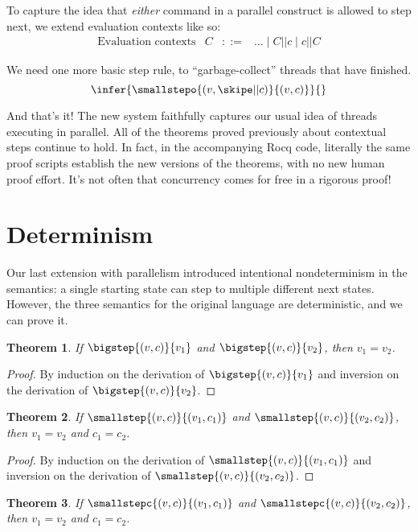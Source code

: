 \documentclass{amsbook}
\newtheorem{theorem}{Theorem}[chapter]
\theoremstyle{definition}
\theoremstyle{remark}
\numberwithin{section}{chapter}
\numberwithin{equation}{chapter}
\begin{document}
To capture the idea that \emph{either} command in a parallel construct is allowed to step next, we extend evaluation contexts like so:
\encoding
$$\begin{array}{rrcl}
  \textrm{Evaluation contexts} & C &::=& \ldots \mid C || c \mid c || C
\end{array}$$

We need one more basic step rule, to ``garbage-collect'' threads that have finished.
$$\infer{\smallstepo{(v, \skipe || c)}{(v, c)}}{}$$

And that's it!
The new system faithfully captures our usual idea of threads executing in parallel.
All of the theorems proved previously about contextual steps continue to hold.
In fact, in the accompanying Rocq code, literally the same proof scripts establish the new versions of the theorems, with no new human proof effort.
It's not often that concurrency comes for free in a rigorous proof!


\section{Determinism}

Our last extension with parallelism introduced intentional nondeterminism in the semantics: a single starting state can step to multiple different next states.
However, the three semantics for the original language are deterministic, and we can prove it.

\begin{theorem}
  If $\bigstep{(v, c)}{v_1}$ and $\bigstep{(v, c)}{v_2}$, then $v_1 = v_2$.
\end{theorem}

\begin{proof}
  By induction on the derivation of $\bigstep{(v, c)}{v_1}$ and inversion on the derivation of $\bigstep{(v, c)}{v_2}$.
\end{proof}

\begin{theorem}
  If $\smallstep{(v, c)}{(v_1, c_1)}$ and $\smallstep{(v, c)}{(v_2, c_2)}$, then $v_1 = v_2$ and $c_1 = c_2$.
\end{theorem}

\begin{proof}
  By induction on the derivation of $\smallstep{(v, c)}{(v_1, c_1)}$ and inversion on the derivation of $\smallstep{(v, c)}{(v_2, c_2)}$.
\end{proof}

\begin{theorem}
  If $\smallstepc{(v, c)}{(v_1, c_1)}$ and $\smallstepc{(v, c)}{(v_2, c_2)}$, then $v_1 = v_2$ and $c_1 = c_2$.
\end{theorem}
\end{document}
